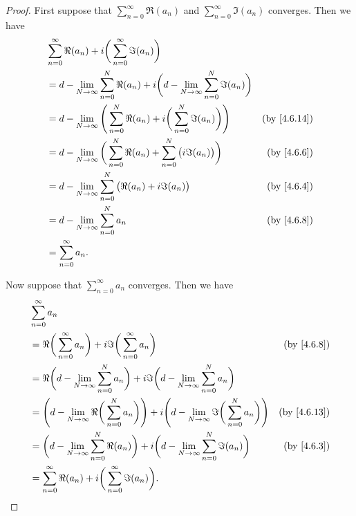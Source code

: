 \begin{proof}
  First suppose that \(\sum_{n = 0}^\infty \Re(a_n)\) and \(\sum_{n = 0}^\infty \Im(a_n)\) converges.
  Then we have
  \begin{align*}
     & \sum_{n = 0}^\infty \Re(a_n) + i \bigg(\sum_{n = 0}^\infty \Im(a_n)\bigg)                                                                     \\
     & = d - \lim_{N \to \infty} \sum_{n = 0}^N \Re(a_n) + i \bigg(d - \lim_{N \to \infty} \sum_{n = 0}^N \Im(a_n)\bigg)                             \\
     & = d - \lim_{N \to \infty} \Bigg(\sum_{n = 0}^N \Re(a_n) + i \bigg(\sum_{n = 0}^N \Im(a_n)\bigg)\Bigg)             & \text{(by \cref{4.6.14})} \\
     & = d - \lim_{N \to \infty} \bigg(\sum_{n = 0}^N \Re(a_n) + \sum_{n = 0}^N \big(i \Im(a_n)\big)\bigg)               & \text{(by \cref{4.6.6})}  \\
     & = d - \lim_{N \to \infty} \sum_{n = 0}^N \big(\Re(a_n) + i \Im(a_n)\big)                                          & \text{(by \cref{4.6.4})}  \\
     & = d - \lim_{N \to \infty} \sum_{n = 0}^N a_n                                                                      & \text{(by \cref{4.6.8})}  \\
     & = \sum_{n = 0}^\infty a_n.
  \end{align*}

  Now suppose that \(\sum_{n = 0}^\infty a_n\) converges.
  Then we have
  \begin{align*}
     & \sum_{n = 0}^\infty a_n                                                                                                                                                       \\
     & = \Re\bigg(\sum_{n = 0}^\infty a_n\bigg) + i \Im\bigg(\sum_{n = 0}^\infty a_n\bigg)                                                               & \text{(by \cref{4.6.8})}  \\
     & = \Re\bigg(d - \lim_{N \to \infty} \sum_{n = 0}^N a_n\bigg) + i \Im\bigg(d - \lim_{N \to \infty} \sum_{n = 0}^N a_n\bigg)                                                     \\
     & = \Bigg(d - \lim_{N \to \infty} \Re\bigg(\sum_{n = 0}^N a_n\bigg)\Bigg) + i \Bigg(d - \lim_{N \to \infty} \Im\bigg(\sum_{n = 0}^N a_n\bigg)\Bigg) & \text{(by \cref{4.6.13})} \\
     & = \bigg(d - \lim_{N \to \infty} \sum_{n = 0}^N \Re(a_n)\bigg) + i \bigg(d - \lim_{N \to \infty} \sum_{n = 0}^N \Im(a_n)\bigg)                     & \text{(by \cref{4.6.3})}  \\
     & = \sum_{n = 0}^\infty \Re(a_n) + i \bigg(\sum_{n = 0}^\infty \Im(a_n)\bigg).
  \end{align*}
\end{proof}

